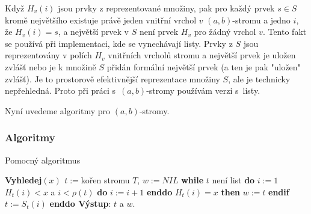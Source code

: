 \documentclass[a4paper,12pt]{article}
\begin{document}
Když $H_v(i)$ jsou prvky z reprezentované 
množiny, pak pro každý prvek $s\in S$ kromě největšího 
existuje právě jeden vnitř\-ní vrchol $v$ $(a,b)$-stromu 
a jedno $i$, že $H_v(i)=s$, a největší prvek v $S$ není prvek 
$H_v$ pro žádný vrchol $v$. Tento fakt se používá při 
implementaci, kde se vynechávají listy. Prvky z $S$ jsou 
reprezentovány v polích $H_v$ vnitř\-ních vrcholů 
stromu 
a největší prvek je uložen zvlášť nebo je k množině $S$ přidán 
formální největší prvek (a ten je pak "uložen" zvlášť). Je to prostorově 
efektivnější reprezentace množiny $S$, ale je technicky 
nepřehledná. Proto při práci s~$(a,b)$-stromy používám 
verzi s~listy.

Nyní uvedeme algoritmy pro $(a,b)$-stromy.

\subsubsection{Algoritmy}

Pomocný algoritmus

{\bf Vyhledej$(x)$\newline 
$t:=$}kořen stromu $T$, $w:=NIL$\newline 
{\bf while} $t$ není list {\bf do}\newline 
\phantom{---}$i:=1$\newline 
\phantom{---}{\bf while} $H_t(i)<x$ a $i<\rho (t)$ {\bf do} $i:=i+1$ {\bf enddo}\newline 
\phantom{---}{\bf if} $H_t(i)=x$ {\bf then} $w:=t$ {\bf endif}\newline 
$t:=S_t(i)$ {\bf enddo Výstup}: $t$ a $w$.
\end{document}
